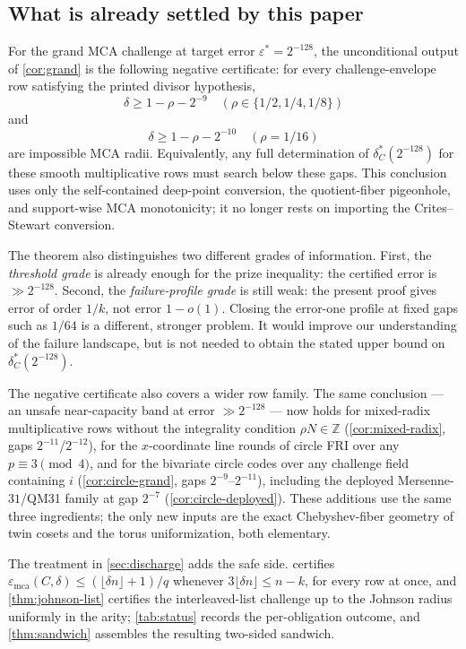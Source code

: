 \documentclass[11pt]{article}
\theoremstyle{definition}
\theoremstyle{remark}
\newcommand{\emca}{\varepsilon_{\mathrm{mca}}}
\begin{document}
\subsection{What is already settled by this paper}

For the grand MCA challenge at target error $\varepsilon^*=2^{-128}$, the
unconditional output of \cref{cor:grand} is the following negative certificate:
for every challenge-envelope row satisfying the printed divisor hypothesis,
\[
        \delta\ge 1-\rho-2^{-9}
        \quad(\rho\in\{1/2,1/4,1/8\})
\]
and
\[
        \delta\ge 1-\rho-2^{-10}
        \quad(\rho=1/16)
\]
are impossible MCA radii.  Equivalently, any full determination of
$\delta_C^*(2^{-128})$ for these smooth multiplicative rows must search below
these gaps.  This conclusion uses only the self-contained deep-point conversion,
the quotient-fiber pigeonhole, and support-wise MCA monotonicity; it no longer
rests on importing the Crites--Stewart conversion.

The theorem also distinguishes two different grades of information.  First, the
\emph{threshold grade} is already enough for the prize inequality: the certified
error is $\gg2^{-128}$.  Second, the \emph{failure-profile grade} is still weak:
the present proof gives error of order $1/k$, not error $1-o(1)$.  Closing the
error-one profile at fixed gaps such as $1/64$ is a different, stronger problem.
It would improve our understanding of the failure landscape, but is not needed
to obtain the stated upper bound on $\delta_C^*(2^{-128})$.

The negative certificate also covers a wider row family.  The
same conclusion --- an unsafe near-capacity band at error $\gg2^{-128}$ ---
now holds for mixed-radix multiplicative rows without the integrality
condition $\rho N\in\mathbb Z$ (\cref{cor:mixed-radix}, gaps
$2^{-11}$/$2^{-12}$), for the $x$-coordinate line rounds of circle FRI over
any $p\equiv3\pmod4$, and for the bivariate circle codes over any challenge
field containing $i$ (\cref{cor:circle-grand}, gaps $2^{-9}$--$2^{-11}$),
including the deployed Mersenne-$31$/QM31 family at gap $2^{-7}$
(\cref{cor:circle-deployed}).  These additions use the same three
ingredients; the only new inputs are the exact Chebyshev-fiber geometry of
twin cosets and the torus uniformization, both elementary.

The treatment in \cref{sec:discharge} adds the safe side.  certifies $\emca(C,\delta)\le(\lfloor\delta n\rfloor+1)/q$ whenever $3\lfloor\delta n\rfloor\le n-k$, for every row at once, and \cref{thm:johnson-list} certifies the interleaved-list challenge up to the Johnson radius uniformly in the arity; \cref{tab:status} records the per-obligation outcome, and \cref{thm:sandwich} assembles the resulting two-sided sandwich.
\end{document}
